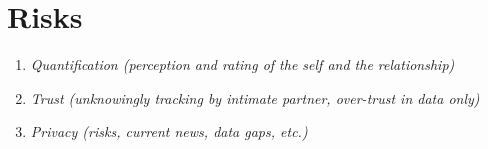 \section{Risks}

\begin{enumerate}
	\item \textit{Quantification (perception and rating of the self and the relationship)}
	\item \textit{Trust (unknowingly tracking by intimate partner, over-trust in data only)}
	\item \textit{Privacy (risks, current news, data gaps, etc.)}
\end{enumerate}
